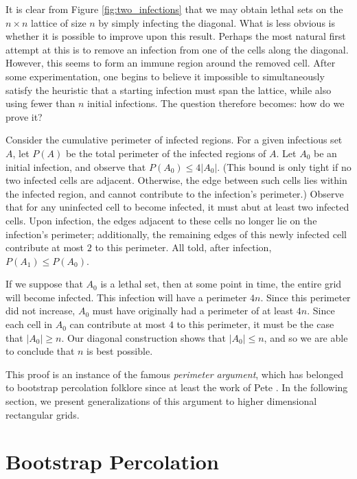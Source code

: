It is clear from Figure \ref{fig:two_infections} that we may obtain lethal sets on the $n \times n$ lattice of size $n$ by simply infecting the diagonal. What is less obvious is whether it is possible to improve upon this result. Perhaps the most natural first attempt at this is to remove an infection from one of the cells along the diagonal. However, this seems to form an immune region around the removed cell. After some experimentation, one begins to believe it impossible to simultaneously satisfy the heuristic that a starting infection must span the lattice, while also using fewer than $n$ initial infections. The question therefore becomes: how do we prove it?

Consider the cumulative perimeter of infected regions. For a given infectious set $A$, let $P(A)$ be the total perimeter of the infected regions of $A$. Let $A_0$ be an initial infection, and observe that $P(A_0) \leq 4 |A_0|$. (This bound is only tight if no two infected cells are adjacent. Otherwise, the edge between such cells lies within the infected region, and cannot contribute to the infection's perimeter.) Observe that for any uninfected cell to become infected, it must abut at least two infected cells. Upon infection, the edges adjacent to these cells no longer lie on the infection's perimeter; additionally, the remaining edges of this newly infected cell contribute at most $2$ to this perimeter. All told, after infection, $P(A_1) \leq P(A_0)$. 

If we suppose that $A_0$ is a lethal set, then at some point in time, the entire grid will become infected. This infection will have a perimeter $4n$. Since this perimeter did not increase, $A_0$ must have originally had a perimeter of at least $4n$. Since each cell in $A_0$ can contribute at most $4$ to this perimeter, it must be the case that $|A_0| \geq n$. Our diagonal construction shows that $|A_0| \leq n$, and so we are able to conclude that $n$ is best possible.

This proof is an instance of the famous \emph{perimeter argument}, which has belonged to bootstrap percolation folklore since at least the work of Pete \cite{pete:1997}. In the following section, we present generalizations of this argument to higher dimensional rectangular grids.

\section{Bootstrap Percolation}

